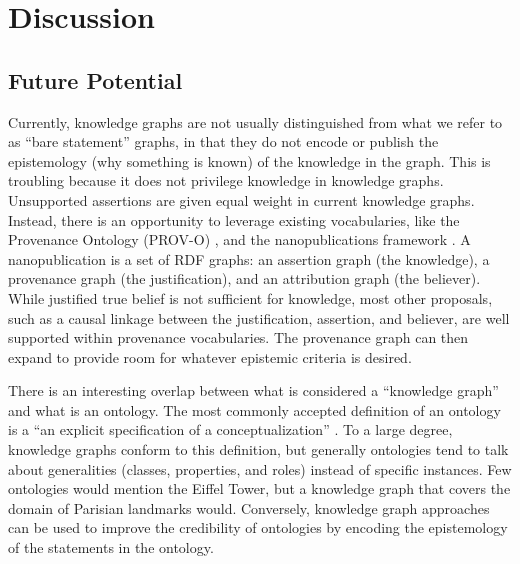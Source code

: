 \section{Discussion}



\subsection{Future Potential}

Currently, knowledge graphs are not usually distinguished from what we refer to as ``bare statement'' graphs, in that they do not encode or publish the epistemology (why something is known) of the knowledge in the graph.
This is troubling because it does not privilege knowledge in knowledge graphs.
Unsupported assertions are given equal weight in current knowledge graphs.
Instead, there is an opportunity to leverage existing vocabularies, like the Provenance Ontology (PROV-O) \cite{Moreau_2015}, and the nanopublications framework \cite{groth2010anatomy}.
A nanopublication is a set of RDF graphs: an assertion graph (the knowledge), a provenance graph (the justification), and an attribution graph (the believer).
While justified true belief is not sufficient for knowledge, most other proposals, such as a causal linkage between the justification, assertion, and believer, are well supported within provenance vocabularies.
The provenance graph can then expand to provide room for whatever epistemic criteria is desired.

There is an interesting overlap between what is considered a ``knowledge graph'' and what is an ontology.
The most commonly accepted definition of an ontology is a ``an explicit specification of a conceptualization'' \cite{Gruber_1993}.
To a large degree, knowledge graphs conform to this definition, but generally ontologies tend to talk about generalities (classes, properties, and roles) instead of specific instances.
Few ontologies would mention the Eiffel Tower, but a knowledge graph that covers the domain of Parisian landmarks would.
Conversely, knowledge graph approaches can be used to improve the credibility of ontologies by encoding the epistemology of the statements in the ontology.
